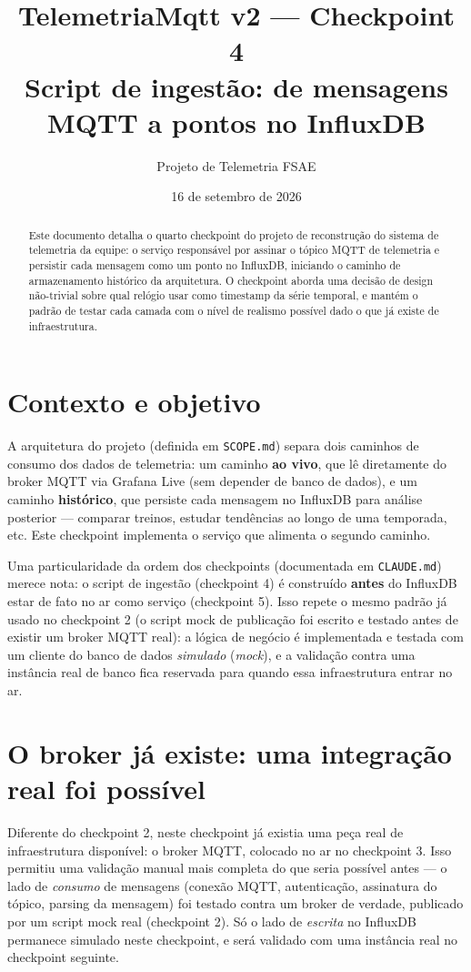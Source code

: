 \documentclass[11pt,a4paper]{article}
\title{\textbf{TelemetriaMqtt v2 --- Checkpoint 4} \\[4pt]
\large Script de ingestão: de mensagens MQTT a pontos no InfluxDB}
\author{Projeto de Telemetria FSAE}
\date{16 de setembro de 2026}
\begin{document}
\maketitle

\begin{abstract}
\noindent Este documento detalha o quarto checkpoint do projeto de reconstrução do sistema de telemetria da equipe: o serviço responsável por assinar o tópico MQTT de telemetria e persistir cada mensagem como um ponto no InfluxDB, iniciando o caminho de armazenamento histórico da arquitetura. O checkpoint aborda uma decisão de design não-trivial sobre qual relógio usar como timestamp da série temporal, e mantém o padrão de testar cada camada com o nível de realismo possível dado o que já existe de infraestrutura.
\end{abstract}

\tableofcontents

\section{Contexto e objetivo}

A arquitetura do projeto (definida em \texttt{SCOPE.md}) separa dois caminhos de consumo dos dados de telemetria: um caminho \textbf{ao vivo}, que lê diretamente do broker MQTT via Grafana Live (sem depender de banco de dados), e um caminho \textbf{histórico}, que persiste cada mensagem no InfluxDB para análise posterior --- comparar treinos, estudar tendências ao longo de uma temporada, etc. Este checkpoint implementa o serviço que alimenta o segundo caminho.

Uma particularidade da ordem dos checkpoints (documentada em \texttt{CLAUDE.md}) merece nota: o script de ingestão (checkpoint 4) é construído \textbf{antes} do InfluxDB estar de fato no ar como serviço (checkpoint 5). Isso repete o mesmo padrão já usado no checkpoint 2 (o script mock de publicação foi escrito e testado antes de existir um broker MQTT real): a lógica de negócio é implementada e testada com um cliente do banco de dados \textit{simulado} (\textit{mock}), e a validação contra uma instância real de banco fica reservada para quando essa infraestrutura entrar no ar.

\section{O broker já existe: uma integração real foi possível}

Diferente do checkpoint 2, neste checkpoint já existia uma peça real de infraestrutura disponível: o broker MQTT, colocado no ar no checkpoint 3. Isso permitiu uma validação manual mais completa do que seria possível antes --- o lado de \textit{consumo} de mensagens (conexão MQTT, autenticação, assinatura do tópico, parsing da mensagem) foi testado contra um broker de verdade, publicado por um script mock real (checkpoint 2). Só o lado de \textit{escrita} no InfluxDB permanece simulado neste checkpoint, e será validado com uma instância real no checkpoint seguinte.
\end{document}
